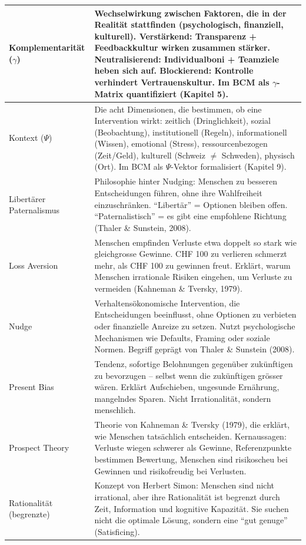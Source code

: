 \documentclass[11pt,a4paper]{article}
\begin{document}
\begin{longtable}{@{}L{4cm}L{10cm}@{}}
\midrule
Komplementarität ($\gamma$) & Wechselwirkung zwischen Faktoren, die in der Realität stattfinden (psychologisch, finanziell, kulturell). Verstärkend: Transparenz + Feedbackkultur wirken zusammen stärker. Neutralisierend: Individualboni + Teamziele heben sich auf. Blockierend: Kontrolle verhindert Vertrauenskultur. Im BCM als $\gamma$-Matrix quantifiziert (Kapitel 5). \\
\midrule
Kontext ($\Psi$) & Die acht Dimensionen, die bestimmen, ob eine Intervention wirkt: zeitlich (Dringlichkeit), sozial (Beobachtung), institutionell (Regeln), informationell (Wissen), emotional (Stress), ressourcenbezogen (Zeit/Geld), kulturell (Schweiz $\neq$ Schweden), physisch (Ort). Im BCM als $\Psi$-Vektor formalisiert (Kapitel 9). \\
\midrule
Libertärer Paternalismus & Philosophie hinter Nudging: Menschen zu besseren Entscheidungen führen, ohne ihre Wahlfreiheit einzuschränken. ``Libertär'' = Optionen bleiben offen. ``Paternalistisch'' = es gibt eine empfohlene Richtung (Thaler \& Sunstein, 2008). \\
\midrule
Loss Aversion & Menschen empfinden Verluste etwa doppelt so stark wie gleichgrosse Gewinne. CHF 100 zu verlieren schmerzt mehr, als CHF 100 zu gewinnen freut. Erklärt, warum Menschen irrationale Risiken eingehen, um Verluste zu vermeiden (Kahneman \& Tversky, 1979). \\
\midrule
Nudge & Verhaltensökonomische Intervention, die Entscheidungen beeinflusst, ohne Optionen zu verbieten oder finanzielle Anreize zu setzen. Nutzt psychologische Mechanismen wie Defaults, Framing oder soziale Normen. Begriff geprägt von Thaler \& Sunstein (2008). \\
\midrule
Present Bias & Tendenz, sofortige Belohnungen gegenüber zukünftigen zu bevorzugen -- selbst wenn die zukünftigen grösser wären. Erklärt Aufschieben, ungesunde Ernährung, mangelndes Sparen. Nicht Irrationalität, sondern menschlich. \\
\midrule
Prospect Theory & Theorie von Kahneman \& Tversky (1979), die erklärt, wie Menschen tatsächlich entscheiden. Kernaussagen: Verluste wiegen schwerer als Gewinne, Referenzpunkte bestimmen Bewertung, Menschen sind risikoscheu bei Gewinnen und risikofreudig bei Verlusten. \\
\midrule
Rationalität (begrenzte) & Konzept von Herbert Simon: Menschen sind nicht irrational, aber ihre Rationalität ist begrenzt durch Zeit, Information und kognitive Kapazität. Sie suchen nicht die optimale Lösung, sondern eine ``gut genuge'' (Satisficing). \\

\end{longtable}
\end{document}
